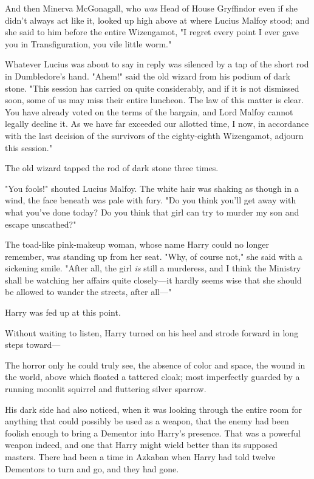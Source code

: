 And then Minerva McGonagall, who \emph{was} Head of House Gryffindor even if
she didn't always act like it, looked up high above at where Lucius Malfoy
stood; and she said to him before the entire Wizengamot, "I regret every point
I ever gave you in Transfiguration, you vile little worm."

Whatever Lucius was about to say in reply was silenced by a tap of the short
rod in Dumbledore's hand. "Ahem!" said the old wizard from his podium of dark
stone. "This session has carried on quite considerably, and if it is not
dismissed soon, some of us may miss their entire luncheon. The law of this
matter is clear. You have already voted on the terms of the bargain, and Lord
Malfoy cannot legally decline it. As we have far exceeded our allotted time, I
now, in accordance with the last decision of the survivors of the eighty-eighth
Wizengamot, adjourn this session."

The old wizard tapped the rod of dark stone three times.

"You fools!" shouted Lucius Malfoy. The white hair was shaking as though in a
wind, the face beneath was pale with fury. "Do you think you'll get away with
what you've done today? Do you think that girl can try to murder my son and
escape unscathed?"

The toad-like pink-makeup woman, whose name Harry could no longer remember, was
standing up from her seat. "Why, of course not," she said with a sickening
smile. "After all, the girl \emph{is} still a murderess, and I think the
Ministry shall be watching her affairs quite closely---it hardly seems wise
that she should be allowed to wander the streets, after all---"

Harry was fed up at this point.

Without waiting to listen, Harry turned on his heel and strode forward in long
steps toward---

The horror only he could truly see, the absence of color and space, the wound
in the world, above which floated a tattered cloak; most imperfectly guarded by
a running moonlit squirrel and fluttering silver sparrow.

His dark side had also noticed, when it was looking through the entire room for
anything that could possibly be used as a weapon, that the enemy had been
foolish enough to bring a Dementor into Harry's presence. That was a powerful
weapon indeed, and one that Harry might wield better than its supposed masters.
There had been a time in Azkaban when Harry had told twelve Dementors to turn
and go, and they had gone.

